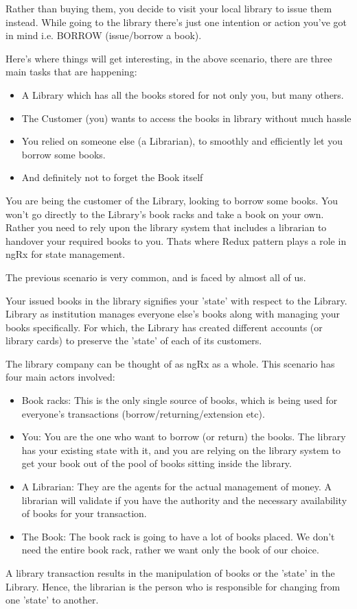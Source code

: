 \documentclass{report}
\begin{document}
Rather than buying them, you decide to visit your local library to issue them instead. While going to the library there’s just one intention or action you’ve got in mind i.e. BORROW (issue/borrow a book).

Here’s where things will get interesting, in the above scenario, there are three main tasks that are happening:

\begin{itemize}
	\item{A Library which has all the books stored for not only you, but many others.}
	\item{The Customer (you) wants to access the books in library without much hassle}
	\item{You relied on someone else (a Librarian), to smoothly and efficiently let you borrow some books. }
	\item{And definitely not to forget the Book itself}
\end{itemize}

You are being the customer of the Library, looking to borrow some books. You won't go directly to the Library's book racks and take a book on your own. Rather you need to rely upon the library system that includes a librarian to handover your required books to you. 
Thats where Redux pattern plays a role in ngRx for state management.

The previous scenario is very common, and is faced by almost all of us.

Your issued books in the library signifies your 'state' with respect to the Library. Library as institution manages everyone else's books along with managing your books specifically. For which, the Library has created different accounts (or library cards) to preserve the 'state' of each of its customers.

The library company can be thought of as ngRx as a whole. This scenario has four main actors involved: 
\begin{itemize}
	\item{Book racks: This is the only single source of books, which is being used for everyone's transactions (borrow/returning/extension etc).}
	\item{You: You are the one who want to borrow (or return) the books. The library has your existing state with it, and you are relying on the library system to get your book out of the pool of books sitting inside the library.}
	\item{A Librarian: They are the agents for the actual management of money. A librarian will validate if you have the authority and the necessary availability of books for your transaction. }
	\item{The Book: The book rack is going to have a lot of books placed. We don't need the entire book rack, rather we want only the book of our choice.}
\end{itemize}
A library transaction results in the manipulation of books or the 'state' in the Library. Hence, the librarian is the person who is responsible for changing from one 'state' to another.
\end{document}

